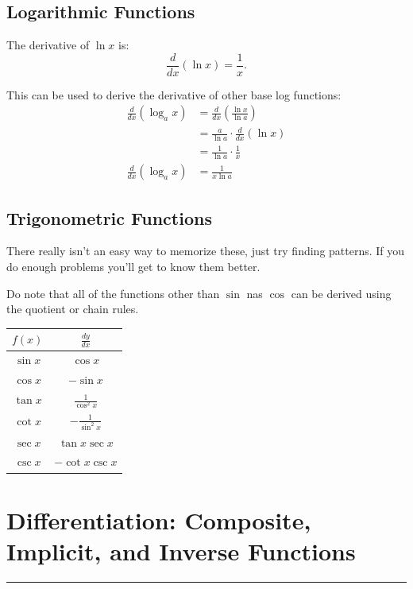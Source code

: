 \documentclass[12pt]{article}
\newcommand{\fline}{\par\noindent\rule{\textwidth}{0.1pt}} %
\begin{document}
\subsection{Logarithmic Functions}
\noindent The derivative of $\ln{x}$ is:
\[ \frac{d}{dx} \left( \ln{x} \right) = \frac{1}{x}. \]

\noindent This can be used to derive the derivative of other base log functions:
\begin{align*}
    \frac{d}{dx} \left( \log_a{x} \right) & = \frac{d}{dx} \left( \frac{\ln{x}}{\ln{a}} \right)         \\[6pt]
                                          & = \frac{a}{\ln{a}} \cdot \frac{d}{dx} \left( \ln{x} \right) \\[6pt]
                                          & = \frac{1}{\ln{a}} \cdot \frac{1}{x}                        \\[6pt]
    \frac{d}{dx} \left( \log_a{x} \right) & = \frac{1}{x \ln{a}}
\end{align*}

\subsection{Trigonometric Functions}
There really isn't an easy way to memorize these, just try finding patterns. If you do enough problems you'll get to know them better.

Do note that all of the functions other than $\sin$ nas $\cos$ can be derived using the quotient or chain rules.
\begin{center}
    \begin{tabular}{|c|c|}
        \hline
        $f(x)$    & $\frac{dy}{dx}$        \\
        \hline \hline
        $\sin{x}$ & $\cos{x}$              \\
        \hline
        $\cos{x}$ & $-\sin{x}$             \\
        \hline
        $\tan{x}$ & $\frac{1}{\cos^2{x}}$  \\
        \hline \hline
        $\cot{x}$ & $-\frac{1}{\sin^2{x}}$ \\
        \hline
        $\sec{x}$ & $\tan{x} \sec{x}$      \\
        \hline
        $\csc{x}$ & $-\cot{x} \csc{x}$     \\
        \hline
    \end{tabular}
\end{center}

\section{Differentiation: Composite, Implicit, and Inverse Functions}
\fline
\end{document}
